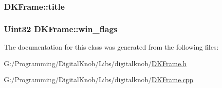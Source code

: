\hypertarget{class_d_k_frame_ab17b09cc37e0dc902e3a351891dbcff5}{
\subsubsection[{title}]{ D\-K\-Frame\-::title}}\label{class_d_k_frame_ab17b09cc37e0dc902e3a351891dbcff5}
\hypertarget{class_d_k_frame_a84d0766442bdae51207d85b6d7d6fbd2}{
\subsubsection[{win\-\_\-flags}]{\setlength{\rightskip}{0pt plus 5cm}Uint32 D\-K\-Frame\-::win\-\_\-flags}}\label{class_d_k_frame_a84d0766442bdae51207d85b6d7d6fbd2}


The documentation for this class was generated from the following files\-:\begin{DoxyCompactItemize}
\item 
G\-:/\-Programming/\-Digital\-Knob/\-Libs/digitalknob/\hyperlink{_d_k_frame_8h}{D\-K\-Frame.\-h}\item 
G\-:/\-Programming/\-Digital\-Knob/\-Libs/digitalknob/\hyperlink{_d_k_frame_8cpp}{D\-K\-Frame.\-cpp}\end{DoxyCompactItemize}
